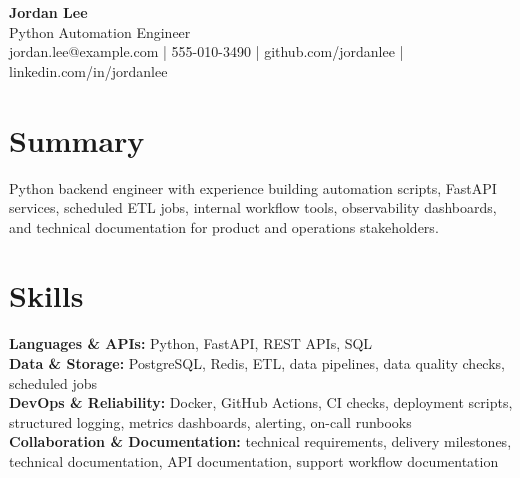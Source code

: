 \documentclass[10pt,letterpaper]{article}
\begin{document}
\begin{center}
{\LARGE \textbf{ Jordan Lee }}\\
Python Automation Engineer\\
jordan.lee@example.com | 555-010-3490 | github.com/jordanlee | linkedin.com/in/jordanlee
\end{center}

\section*{Summary}
Python backend engineer with experience building automation scripts, FastAPI services, scheduled ETL jobs, internal workflow tools, observability dashboards, and technical documentation for product and operations stakeholders.

\section*{Skills}
\textbf{Languages \& APIs:} Python, FastAPI, REST APIs, SQL\\
\textbf{Data \& Storage:} PostgreSQL, Redis, ETL, data pipelines, data quality checks, scheduled jobs\\
\textbf{DevOps \& Reliability:} Docker, GitHub Actions, CI checks, deployment scripts, structured logging, metrics dashboards, alerting, on-call runbooks\\
\textbf{Collaboration \& Documentation:} technical requirements, delivery milestones, technical documentation, API documentation, support workflow documentation\\
\end{document}
